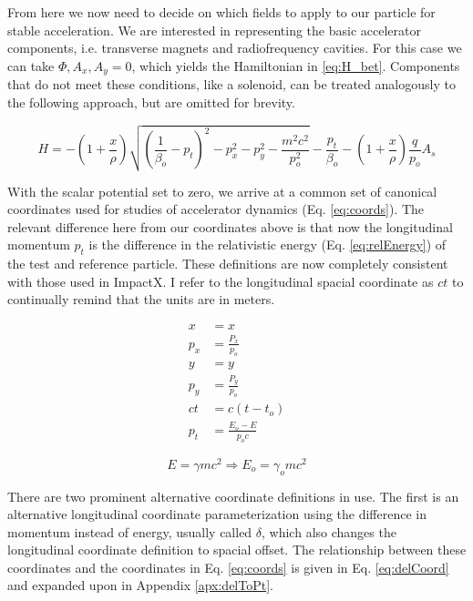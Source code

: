 From here we now need to decide on which fields to apply to our particle for stable acceleration. We are interested in representing the basic accelerator components, i.e. transverse magnets and radiofrequency cavities. For this case we can take $\Phi, A_x, A_y = 0$, which yields the Hamiltonian in \ref{eq:H_bet}. Components that do not meet these conditions, like a solenoid, can be treated analogously to the following approach, but are omitted for brevity.

\begin{equation} \label{eq:H_bet}
	H = -\left(1 + \frac{x}{\rho}\right)\sqrt{\left(\frac{1}{\beta_o} - p_t \right)^2 - p_x^2 - p_y^2- \frac{m^2c^2}{p_o^2}} - \frac{p_t}{\beta_o} - \left(1 + \frac{x}{\rho}\right)\frac{q}{p_o}A_s
\end{equation}

With the scalar potential set to zero, we arrive at a common set of canonical coordinates used for studies of accelerator dynamics (Eq. \ref{eq:coords}). The relevant difference here from our coordinates above is that now the longitudinal momentum $p_t$ is the difference in the relativistic energy (Eq. \ref{eq:relEnergy}) of the test and reference particle. These definitions are now completely consistent with those used in ImpactX. I refer to the longitudinal spacial coordinate as $ct$ to continually remind that the units are in meters.

\begin{equation} \label{eq:coords}
\begin{split}
x &= x\\
p_x &= \frac{P_x}{p_o}\\
y &= y\\
p_y &= \frac{P_y}{p_o}\\
ct &= c(t-t_o)\\
p_t &= \frac{E_o-E}{p_o c}
\end{split}
\end{equation}

\begin{equation} \label{eq:relEnergy}
	E = \gamma m c^2 \Rightarrow E_o = \gamma_o m c^2
\end{equation}

There are two prominent alternative coordinate definitions in use. The first is an alternative longitudinal coordinate parameterization using the difference in momentum instead of energy, usually called $\delta$, which also changes the longitudinal coordinate definition to spacial offset. The relationship between these coordinates and the coordinates in Eq. \ref{eq:coords} is given in Eq. \ref{eq:delCoord} and expanded upon in Appendix \ref{apx:delToPt}.

